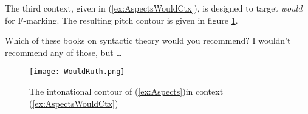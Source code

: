 \documentclass[
	letterpaper,
]{article}
\begin{document}
The third context, given in (\ref{ex:AspectsWouldCtx}), is designed to target \textit{would} for F-marking.
The resulting pitch contour is given in figure \ref{fig:WouldRuth}.
\begin{exe}	
\ex\label{ex:AspectsWouldCtx}
\begin{xlist}
	 Which of these books on syntactic theory would you recommend?
	 I wouldn’t recommend any of those, but \dots
\end{xlist}
\end{exe}
\begin{figure}[h]
	\centering
	\texttt{[image: WouldRuth.png]}
	\caption{The intonational contour of (\ref{ex:Aspects})in context (\ref{ex:AspectsWouldCtx})}
	\label{fig:WouldRuth}
\end{figure}
\FloatBarrier

\nocite{mikkelsen2004specifying}
\printbibliography
\end{document}
